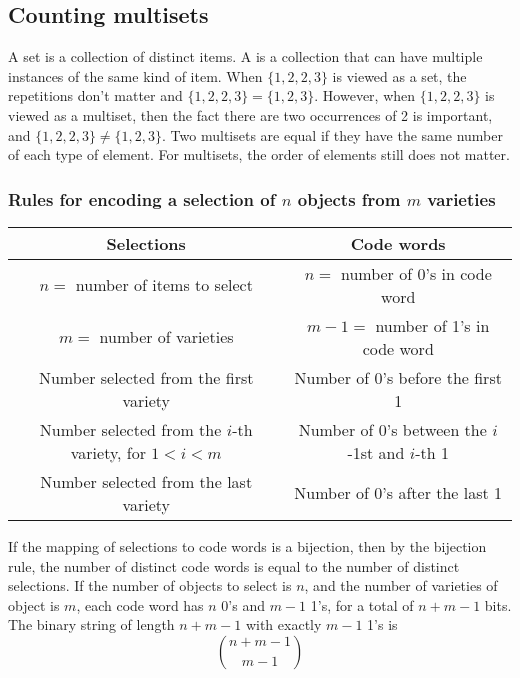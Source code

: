 \subsection{Counting multisets}
A set is a collection of distinct items. A  is a collection that can have multiple instances of the same kind of item. When $\{1,2,2,3\}$ is viewed as a set, the repetitions don't matter and $\{1,2,2,3\} = \{1,2,3\}$. However, when $\{1,2,2,3\}$ is viewed as a multiset, then the fact there are two occurrences of 2 is important, and $\{1,2,2,3\} \neq \{1,2,3\}$. Two multisets are equal if they have the same number of each type of element. For multisets, the order of elements still does not matter.

\subsubsection*{Rules for encoding a selection of $n$ objects from $m$ varieties}
\begin{center}
  \begin{tabular}{|c|c|}
    \hline
    Selections                                               & Code words                                     \\
    \hline
    $n=$ number of items to select                           & $n=$ number of 0's in code word                \\
    $m=$ number of varieties                                 & $m-1=$ number of 1's in code word              \\
    Number selected from the first variety                   & Number of 0's before the first 1               \\
    Number selected from the $i$-th variety, for $1 < i < m$ & Number of 0's between the $i$-1st and $i$-th 1 \\
    Number selected from the last variety                    & Number of 0's after the last 1                 \\
    \hline
  \end{tabular}
\end{center}
If the mapping of selections to code words is a bijection, then by the bijection rule, the number of distinct code words is equal to the number of distinct selections. If the number of objects to select is $n$, and the number of varieties of object is $m$, each code word has $n$ 0's and $m-1$ 1's, for a total of $n+m-1$ bits. The binary string of length $n+m-1$ with exactly $m-1$ 1's is
\[
  \binom{n+m-1}{m-1}
\]

